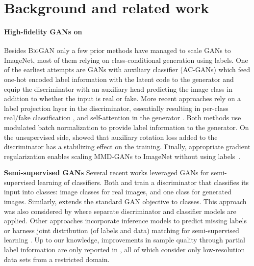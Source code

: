 \documentclass{article}
\newcommand{\biggan}{\textsc{BigGAN}}
\begin{document}
\section{Background and related work}
\paragraph{High-fidelity GANs on \imagenet{}} Besides \biggan{} \cite{brock2018large} only a few prior methods have managed to scale GANs to ImageNet, most of them relying on class-conditional generation using labels. One of the earliest attempts are GANs with auxiliary classifier (AC-GANs) \cite{odena2017conditional} which feed one-hot encoded label information with the latent code to the generator and equip the discriminator with an auxiliary head predicting the image class in addition to whether the input is real or fake. More recent approaches rely on a label projection layer in the discriminator, essentially resulting in per-class real/fake classification \cite{miyato2018cgans}, and  self-attention in the generator \cite{zhang2018self}. Both methods use modulated batch normalization \cite{de2017modulating} to provide label information to the generator. On the unsupervised side, \citet{chen2019self} showed that auxiliary rotation loss added to the discriminator has a stabilizing effect on the training. Finally, appropriate gradient regularization enables scaling MMD-GANs to ImageNet without using labels~\cite{arbel2018gradient}.

\textbf{Semi-supervised GANs} \quad Several recent works leveraged GANs for semi-supervised learning of classifiers. Both \citet{salimans2016improved} and \citet{odena2016semi} train a discriminator that classifies its input into  classes:  image classes for real images, and one class for generated images. Similarly, \citet{springenberg2015unsupervised} extends the standard GAN objective to  classes. This approach was also considered by \citet{li2017triple} where separate discriminator and classifier models are applied. Other approaches incorporate inference models to predict missing labels \citep{deng2017structured} or harness joint distribution (of labels and data) matching for semi-supervised learning \citep{gan2017triangle}. Up to our knowledge, improvements in sample quality through partial label information are only reported in \citet{li2017triple, deng2017structured, sricharan2017semi}, all of which consider only low-resolution data sets from a restricted domain.
\end{document}
